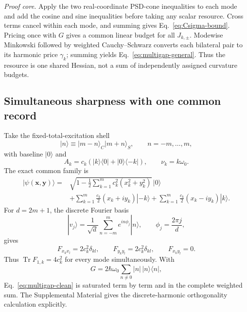 \documentclass[aps,pra,preprint,nofootinbib]{revtex4-2}
\newcommand{\Tr}{\operatorname{Tr}}
\begin{document}
\emph{Proof core.} Apply the two real-coordinate PSD-cone inequalities to each mode and add the cosine and sine inequalities before taking any scalar resource. Cross terms cancel within each mode, and summing gives Eq.~\eqref{eq:Csigma-bound}. Pricing once with $G$ gives a common linear budget for all $J_{k,\pm}$. Modewise Minkowski followed by weighted Cauchy--Schwarz converts each bilateral pair to its harmonic price $\gamma_k$; summing yields Eq.~\eqref{eq:multigap-general}. Thus the resource is one shared Hessian, not a sum of independently assigned curvature budgets.

\subsection{Simultaneous sharpness with one common record}

Take the fixed-total-excitation shell
\begin{equation}
|n\rangle\equiv |m-n\rangle_C|m+n\rangle_S,
\qquad n=-m,\ldots,m,
\end{equation}
with baseline $|0\rangle$ and
\begin{equation}
A_k=c_k(|k\rangle\!\langle0|+|0\rangle\!\langle-k|),
\qquad \nu_k=k\omega_0.
\end{equation}
The exact common family is
\begin{align}
|\psi(\bm x,\bm y)\rangle={}&
\sqrt{1-\frac12\sum_{k=1}^m c_k^2(x_k^2+y_k^2)}\,|0\rangle\nonumber\\
&+\sum_{k=1}^m\frac{c_k}{2}(x_k+i y_k)|-k\rangle
+\sum_{k=1}^m\frac{c_k}{2}(x_k-i y_k)|k\rangle.
\label{eq:star-family}
\end{align}
For $d=2m+1$, the discrete Fourier basis
\begin{equation}
|v_j\rangle=\frac1{\sqrt d}\sum_{n=-m}^{m}e^{in\phi_j}|n\rangle,
\qquad \phi_j=\frac{2\pi j}{d},
\end{equation}
gives
\begin{equation}
F_{x_kx_l}=2c_k^2\delta_{kl},\qquad
F_{y_ky_l}=2c_k^2\delta_{kl},\qquad
F_{x_ky_l}=0.
\label{eq:fourier-F}
\end{equation}
Thus $\Tr F_{1,k}=4c_k^2$ for every mode simultaneously. With
\begin{equation}
G=2\hbar\omega_0\sum_{n\ne0}|n|\,|n\rangle\!\langle n|,
\end{equation}
Eq.~\eqref{eq:multigap-clean} is saturated term by term and in the complete weighted sum. The Supplemental Material gives the discrete-harmonic orthogonality calculation explicitly.
\end{document}
